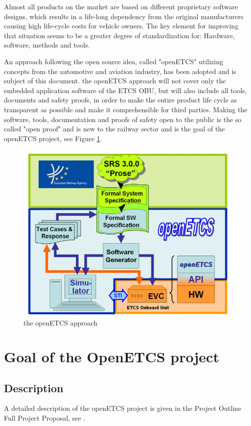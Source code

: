 \documentclass{template/openetcs_report}
\begin{document}
Almost all products on the market are based on different proprietary software designs, which results in a life-long dependency from the original manufacturers causing high life-cycle costs for vehicle owners. The key element for improving that situation seems to be a greater degree of standardization for: Hardware, software, methods and tools.

An approach following the open source idea, called "openETCS" utilizing concepts from the automotive and
aviation industry, has been adopted and is subject of this document.
the openETCS approach will not cover only the embedded application software of the ETCS OBU, but will also include all tools, documents and safety proofs,  in order to make the entire product life cycle as transparent as possible and make it comprehensible for third parties.
Making the software, tools, documentation and proofs of safety open to the public is the so called "open proof" and is new to the railway sector and is the goal of the openETCS project, see Figure \ref{fig:openETCS4}.

\begin{figure}[h]
\centering
\includegraphics[width=12cm]{openETCS4}
\caption{the openETCS approach}
\label{fig:openETCS4}
\end{figure}


\chapter{Goal of the OpenETCS project}
\section{Description}
A detailed description of the openETCS project is given in the Project Outline Full Project
Proposal, see \cite{FPP13}.
\end{document}
